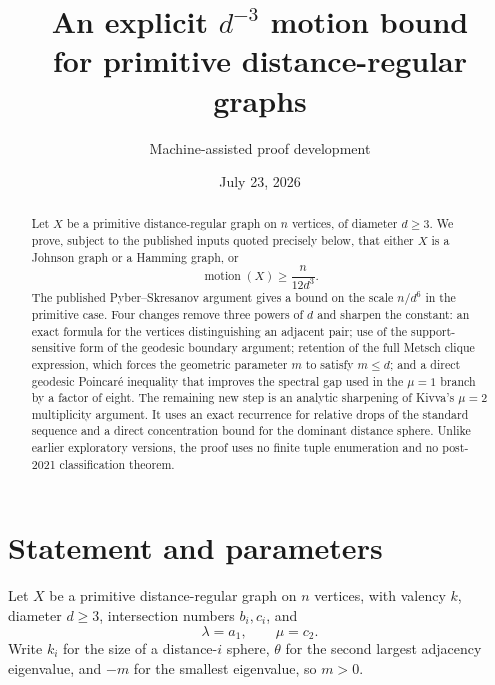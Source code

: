 \documentclass[11pt]{amsart}
\title[An explicit $d^{-3}$ motion bound]{An explicit $d^{-3}$ motion bound\\for primitive distance-regular graphs}
\author{Machine-assisted proof development}
\date{July 23, 2026}
\theoremstyle{definition}
\newcommand{\mot}{\operatorname{motion}}
\begin{document}
\begin{abstract}
Let $X$ be a primitive distance-regular graph on $n$ vertices, of diameter $d\ge3$.
We prove, subject to the published inputs quoted precisely below, that either $X$ is a Johnson graph or a Hamming graph, or
\[
  \mot(X)\ge \frac{n}{12d^3}.
\]
The published Pyber--Skresanov argument gives a bound on the scale $n/d^6$ in the primitive case.  Four changes remove three powers of $d$ and sharpen the constant: an exact formula for the vertices distinguishing an adjacent pair; use of the support-sensitive form of the geodesic boundary argument; retention of the full Metsch clique expression, which forces the geometric parameter $m$ to satisfy $m\le d$; and a direct geodesic Poincar\'e inequality that improves the spectral gap used in the $\mu=1$ branch by a factor of eight.  The remaining new step is an analytic sharpening of Kivva's $\mu=2$ multiplicity argument.  It uses an exact recurrence for relative drops of the standard sequence and a direct concentration bound for the dominant distance sphere.  Unlike earlier exploratory versions, the proof uses no finite tuple enumeration and no post-2021 classification theorem.
\end{abstract}
\maketitle

\begin{center}
\end{center}

\section{Statement and parameters}
Let $X$ be a primitive distance-regular graph on $n$ vertices, with valency $k$, diameter $d\ge3$, intersection numbers $b_i,c_i$, and
\[
  \lambda=a_1,\qquad \mu=c_2.
\]
Write $k_i$ for the size of a distance-$i$ sphere, $\theta$ for the second largest adjacency eigenvalue, and $-m$ for the smallest eigenvalue, so $m>0$.
\end{document}
